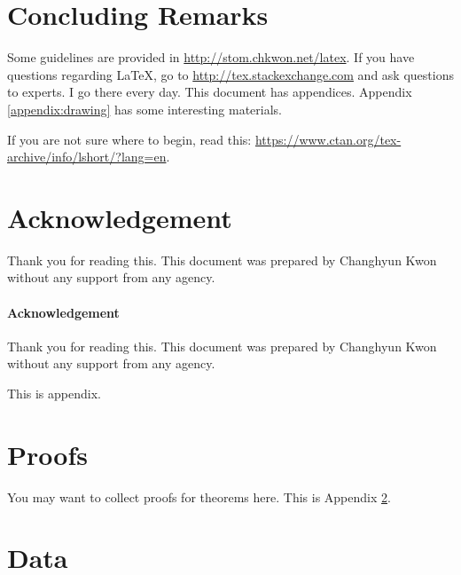 \documentclass[letterpaper, 11pt]{article}
\begin{document}
\section{Concluding Remarks}

Some guidelines are provided in \url{http://stom.chkwon.net/latex}. If you have questions regarding \LaTeX, go to \url{http://tex.stackexchange.com} and ask questions to experts. I go there every day. This document has appendices. Appendix \ref{appendix:drawing} has some interesting materials.

If you are not sure where to begin, read this: \url{https://www.ctan.org/tex-archive/info/lshort/?lang=en}.


\section*{Acknowledgement}
Thank you for reading this. This document was prepared by Changhyun Kwon without any support from any agency.


\paragraph{Acknowledgement} 
Thank you for reading this. This document was prepared by Changhyun Kwon without any support from any agency.











\newpage
\renewcommand{\appendixpagename}{Appendix}

\appendix
\appendixpage

This is appendix.

\section{Proofs} \label{appendix:proofs}

You may want to collect proofs for theorems here. This is Appendix \ref{appendix:proofs}.

\section{Data} \label{appendix:data}
\end{document}
